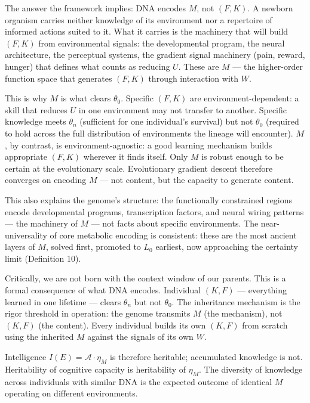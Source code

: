 \documentclass[
]{article}
\begin{document}
\begin{enumerate}
  The answer the framework implies: DNA encodes \(M\), not \((F, K)\). A
  newborn organism carries neither knowledge of its environment nor a
  repertoire of informed actions suited to it. What it carries is the
  machinery that will build \((F, K)\) from environmental signals: the
  developmental program, the neural architecture, the perceptual
  systems, the gradient signal machinery (pain, reward, hunger) that
  defines what counts as reducing \(U\). These are \(M\) --- the
  higher-order function space that generates \((F, K)\) through
  interaction with \(W\).

  This is why \(M\) is what clears \(\theta_0\). Specific \((F, K)\) are
  environment-dependent: a skill that reduces \(U\) in one environment
  may not transfer to another. Specific knowledge meets \(\theta_n\)
  (sufficient for one individual's survival) but not \(\theta_0\)
  (required to hold across the full distribution of environments the
  lineage will encounter). \(M\), by contrast, is environment-agnostic:
  a good learning mechanism builds appropriate \((F, K)\) wherever it
  finds itself. Only \(M\) is robust enough to be certain at the
  evolutionary scale. Evolutionary gradient descent therefore converges
  on encoding \(M\) --- not content, but the capacity to generate
  content.

  This also explains the genome's structure: the functionally
  constrained regions encode developmental programs, transcription
  factors, and neural wiring patterns --- the machinery of \(M\) --- not
  facts about specific environments. The near-universality of core
  metabolic encoding is consistent: these are the most ancient layers of
  \(M\), solved first, promoted to \(L_0\) earliest, now approaching the
  certainty limit (Definition 10).

  Critically, we are not born with the context window of our parents.
  This is a formal consequence of what DNA encodes. Individual
  \((K, F)\) --- everything learned in one lifetime --- clears
  \(\theta_n\) but not \(\theta_0\). The inheritance mechanism is the
  rigor threshold in operation: the genome transmits \(M\) (the
  mechanism), not \((K, F)\) (the content). Every individual builds its
  own \((K, F)\) from scratch using the inherited \(M\) against the
  signals of its own \(W\).

  Intelligence \(I(E) = \mathcal{A} \cdot \eta_M\) is therefore
  heritable; accumulated knowledge is not. Heritability of cognitive
  capacity is heritability of \(\eta_M\). The diversity of knowledge
  across individuals with similar DNA is the expected outcome of
  identical \(M\) operating on different environments.


\end{enumerate}
\end{document}
